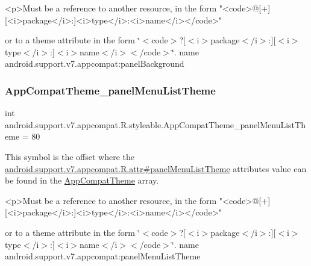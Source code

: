 \begin{DoxyVerb}      <p>Must be a reference to another resource, in the form "<code>@[+][<i>package</i>:]<i>type</i>:<i>name</i></code>"
\end{DoxyVerb}
 or to a theme attribute in the form \char`\"{}$<$code$>$?\mbox{[}$<$i$>$package$<$/i$>$\+:\mbox{]}\mbox{[}$<$i$>$type$<$/i$>$\+:\mbox{]}$<$i$>$name$<$/i$>$$<$/code$>$\char`\"{}.  name android.\+support.\+v7.\+appcompat\+:panel\+Background \mbox{\label{classandroid_1_1support_1_1v7_1_1appcompat_1_1R_1_1styleable_abe4dcb478c5a3aa191bd3e7faf51f323}} 
\subsubsection{\texorpdfstring{App\+Compat\+Theme\+\_\+panel\+Menu\+List\+Theme}{AppCompatTheme\_panelMenuListTheme}}
{\footnotesize\ttfamily int android.\+support.\+v7.\+appcompat.\+R.\+styleable.\+App\+Compat\+Theme\+\_\+panel\+Menu\+List\+Theme = 80\hspace{0.3cm}{\ttfamily [static]}}

This symbol is the offset where the \hyperlink{classandroid_1_1support_1_1v7_1_1appcompat_1_1R_1_1attr_a5d9c2e215ca4e27e12fafdb186c0dc53}{android.\+support.\+v7.\+appcompat.\+R.\+attr\#panel\+Menu\+List\+Theme} attribute\textquotesingle{}s value can be found in the \hyperlink{classandroid_1_1support_1_1v7_1_1appcompat_1_1R_1_1styleable_a5c42f89e8a410c323be34208d75c430b}{App\+Compat\+Theme} array.

\begin{DoxyVerb}      <p>Must be a reference to another resource, in the form "<code>@[+][<i>package</i>:]<i>type</i>:<i>name</i></code>"
\end{DoxyVerb}
 or to a theme attribute in the form \char`\"{}$<$code$>$?\mbox{[}$<$i$>$package$<$/i$>$\+:\mbox{]}\mbox{[}$<$i$>$type$<$/i$>$\+:\mbox{]}$<$i$>$name$<$/i$>$$<$/code$>$\char`\"{}.  name android.\+support.\+v7.\+appcompat\+:panel\+Menu\+List\+Theme \mbox{\label{classandroid_1_1support_1_1v7_1_1appcompat_1_1R_1_1styleable_a6f48a7a199f63c3e2f95ae393ff66aeb}} 
